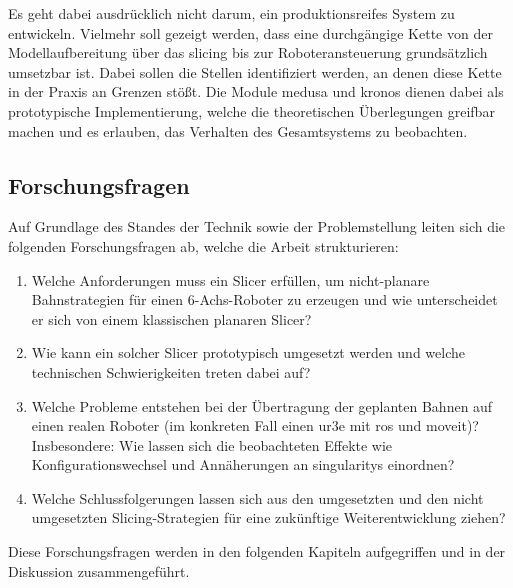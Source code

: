             Es geht dabei ausdrücklich nicht darum, ein produktionsreifes System zu entwickeln.
            Vielmehr soll gezeigt werden, dass eine durchgängige Kette von der Modell\-aufbereitung über das \gls{slicing} bis zur Roboteransteuerung grundsätzlich umsetzbar ist.
            Dabei sollen die Stellen identifiziert werden, an denen diese Kette in der Praxis an Grenzen stößt.
            Die Module \ac{medusa} und \ac{kronos} dienen dabei als prototypische Implementierung, welche die theoretischen Überlegungen greifbar machen und es erlauben, das Verhalten des Gesamtsystems zu beobachten.

        \subsection{Forschungsfragen}\label{subsec:specific-research-questions}
            Auf Grundlage des Standes der Technik sowie der Problemstellung leiten sich die folgenden Forschungsfragen ab, welche die Arbeit strukturieren:

            \begin{enumerate}
                \item Welche Anforderungen muss ein Slicer erfüllen, um nicht-planare Bahnstrategien für einen 6-Achs-Roboter zu erzeugen und wie unterscheidet er sich von einem klassischen planaren Slicer?
                \item Wie kann ein solcher Slicer prototypisch umgesetzt werden und welche technischen Schwierigkeiten treten dabei auf?
                \item Welche Probleme entstehen bei der Übertragung der geplanten Bahnen auf einen realen Roboter (im konkreten Fall einen \ac{ur3e} mit \ac{ros} und \ac{moveit})? Insbesondere: Wie lassen sich die beobachteten Effekte wie Konfigurationswechsel und Annäherungen an \glspl{singularity} einordnen?
                \item Welche Schlussfolgerungen lassen sich aus den umgesetzten und den nicht umgesetzten Slicing-Strategien für eine zukünftige Weiterentwicklung ziehen?
            \end{enumerate}

            Diese Forschungsfragen werden in den folgenden Kapiteln aufgegriffen und in der Diskussion zusammengeführt.

